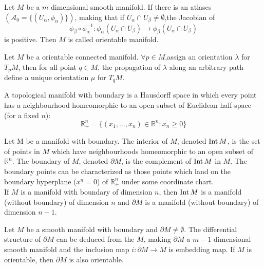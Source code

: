 \begin{newdef}
 Let $M$ be a $m$ dimensional smooth manifold. If there is an atlases $(\mathcal{A_0} = \{(U_{\alpha},\phi_{\alpha})\})$, making that if $U_{\alpha} \cap U_{\beta} \neq \emptyset$,the Jacobian of
\[\phi_{\beta} \circ \phi_{\alpha}^{-1} : \phi_{\alpha}(U_{\alpha} \cap U_{\beta}) \to \phi_{\beta}(U_{\alpha} \cap U_{\beta})\]
is positive. Then $M$ is called orientable manifold.
\end{newdef}

\begin{newthem}
Let $M$ be a orientable connected manifold. $\forall p \in M$,assign an orientation $\lambda$ for $T_pM$, then for all point $q \in M$, the propagation of $\lambda$ along an arbitrary path define a unique orientation $\mu$ for $T_q M$.
\end{newthem}

\begin{newdef}
A topological manifold with boundary is a Hausdorff space in which every point has a neighbourhood homeomorphic to an open subset of Euclidean half-space (for a fixed $n$):
\[\mathbb {R} _{+}^{n}=\{(x_{1},\ldots ,x_{n})\in \mathbb {R} ^{n}:x_{n}\geq 0\}\]
\end{newdef}


\begin{newdef}
Let M be a manifold with boundary. The interior of $M$, denoted ${\rm Int} \, M$, is the set of points in $M$ which have neighbourhoods homeomorphic to an open subset of $\mathbb {R} ^{n}$. The boundary of $M$, denoted $\partial M$, is the complement of ${\rm Int} \, M$ in $M$. The boundary points can be characterized as those points which land on the boundary hyperplane ($x^n=0$) of $ \mathbb {R} _{+}^{n}$ under some coordinate chart.\\
If $M$ is a manifold with boundary of dimension $n$, then ${\rm Int} \, M$ is a manifold (without boundary) of dimension $n$ and $\partial M$ is a manifold (without boundary) of dimension $n-1$.
\end{newdef}

\begin{newthem}
Let $M$ be a smooth manifold with boundary and $\partial M \neq \emptyset$. The differential structure of $\partial M$ can be deduced from the $M$, making $\partial M$ a $m-1$ dimensional smooth manifold and the inclusion map $i:\partial M \to M$ is embedding map. If $M$ is orientable, then $\partial M$ is also orientable.
\end{newthem}

